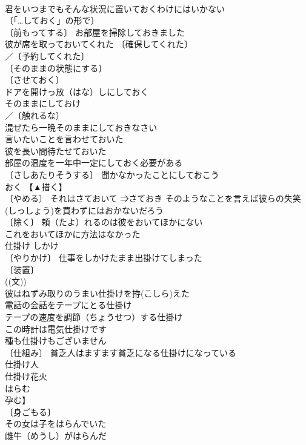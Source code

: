 \documentclass[8pt]{extreport}
\begin{document}
\begin{CJK}{UTF8}{min}
\\	君をいつまでもそんな状況に置いておくわけにはいかない 
\\	〔「…しておく」の形で〕 
\\	〔前もってする〕 お部屋を掃除しておきました 
\\	彼が席を取っておいてくれた 〔確保してくれた〕
\\	／〔予約してくれた〕
\\	〔そのままの状態にする〕
\\	〔させておく〕
\\	ドアを開けっ放（はな）しにしておく 
\\	そのままにしておけ 
\\	／〔触れるな〕
\\	混ぜたら一晩そのままにしておきなさい 
\\	言いたいことを言わせておいた 
\\	彼を長い間待たせておいた 
\\	部屋の温度を一年中一定にしておく必要がある 
\\	〔さしあたりそうする〕 聞かなかったことにしておこう 
\\	おく	【▲措く】	
\\	〔やめる〕 それはさておいて ⇒さておき そのようなことを言えば彼らの失笑(しっしょう)を買わずにはおかないだろう 
\\	〔除く〕 頼（たよ）れるのは彼をおいてほかにない 
\\	これをおいてほかに方法はなかった 
\\	仕掛け	しかけ	
\\	〔やりかけ〕 仕事をしかけたまま出掛けてしまった 
\\	〔装置〕
\\	((文)) 
\\	彼はねずみ取りのうまい仕掛けを拵(こしら)えた 
\\	電話の会話をテープにとる仕掛け 
\\	テープの速度を調節（ちょうせつ）する仕掛け 
\\	この時計は電気仕掛けです 
\\	種も仕掛けもございません 
\\	〔仕組み〕 貧乏人はますます貧乏になる仕掛けになっている 
\\	仕掛け人 
\\	仕掛け花火 
\\	はらむ	
\\	孕む】	
\\	〔身ごもる〕
\\	その女は子をはらんでいた 
\\	雌牛（めうし）がはらんだ 

\end{CJK}
\end{document}
